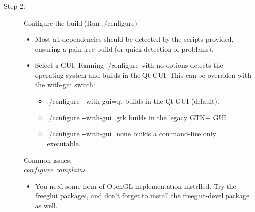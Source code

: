 \begin{description}
	\item[Step 2:\its] Configure the build (Run {\sffamily./configure})
	\begin{itemize}
		\item Most all dependencies should be detected by the scripts provided, ensuring a pain-free build (or quick detection of problems).
		\item Select a GUI. Running {\sffamily./configure} with no options detects the operating system and builds in the Qt GUI. This can be overriden with the {\sffamily {-}{-}with-gui} switch:
		\begin{itemize}
			\item {\sffamily./configure {-}{-}with-gui=qt} builds in the Qt GUI (default).
			\item {\sffamily./configure {-}{-}with-gui=gtk} builds in the legacy GTK+ GUI.
			\item {\sffamily./configure {-}{-}with-gui=none} builds a command-line only executable.
		\end{itemize}
	\end{itemize}
	Common issues:\\
	\emph{$configure$ complains }
	\begin{itemize}
		\item You need some form of OpenGL implementation installed. Try the freeglut packages, and don't forget to install the freeglut-devel package as well.
	\end{itemize}
\end{description}


